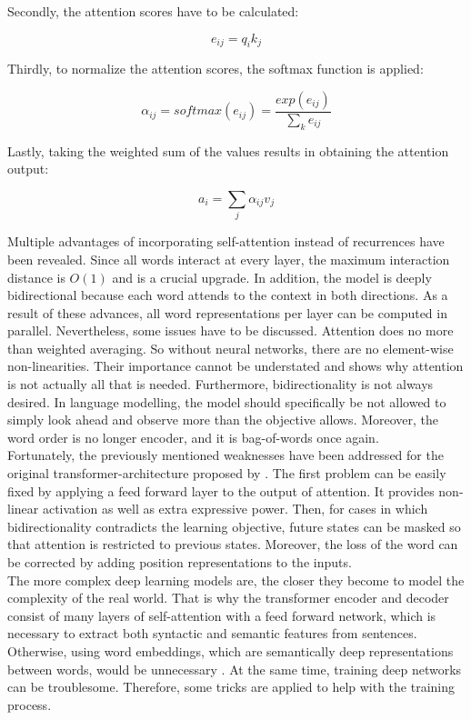 \documentclass[
]{krantz}
\begin{document}
Secondly, the attention scores have to be calculated:

\[e_{ij} = q_i k_j\]

Thirdly, to normalize the attention scores, the softmax function is
applied:

\[\alpha_{ij} = softmax( e_{ij} ) = \frac{exp(e_{ij})}{\displaystyle \sum_k e_{ij}}\]

Lastly, taking the weighted sum of the values results in obtaining the
attention output:

\[a_{i} = \displaystyle \sum_j \alpha_{ij} v_j\]

Multiple advantages of incorporating self-attention instead of
recurrences have been revealed. Since all words interact at every layer,
the maximum interaction distance is \(O(1)\) and is a crucial upgrade. In
addition, the model is deeply bidirectional because each word attends to
the context in both directions. As a result of these advances, all word
representations per layer can be computed in parallel. Nevertheless,
some issues have to be discussed. Attention does no more than weighted
averaging. So without neural networks, there are no element-wise
non-linearities. Their importance cannot be understated and shows why
attention is not actually all that is needed. Furthermore,
bidirectionality is not always desired. In language modelling, the model
should specifically be not allowed to simply look ahead and observe more
than the objective allows. Moreover, the word order is no longer
encoder, and it is bag-of-words once again.\\

Fortunately, the previously mentioned weaknesses have been addressed for
the original transformer-architecture proposed by \citet{Vaswani2017}. The
first problem can be easily fixed by applying a feed forward layer to
the output of attention. It provides non-linear activation as well as
extra expressive power. Then, for cases in which bidirectionality
contradicts the learning objective, future states can be masked so that
attention is restricted to previous states. Moreover, the loss of the
word can be corrected by adding position representations to the inputs.\\

The more complex deep learning models are, the closer they become to
model the complexity of the real world. That is why the transformer
encoder and decoder consist of many layers of self-attention with a feed
forward network, which is necessary to extract both syntactic and
semantic features from sentences. Otherwise, using word embeddings,
which are semantically deep representations between words, would be
unnecessary \citep{Sejnowski2020}. At the same time, training deep
networks can be troublesome. Therefore, some tricks are applied to help
with the training process.\\
\end{document}
